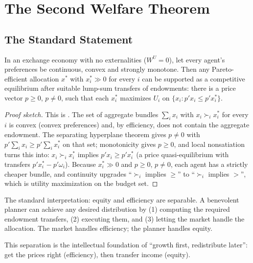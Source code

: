 \documentclass[../structural_economics_book.tex]{subfiles}
\begin{document}
\section{The Second Welfare Theorem}
\label{ch02:sec:SWT}

\subsection{The Standard Statement}

\begin{theorem}\label{ch02:thm:SWT}
In an exchange economy with no externalities ($W^U = 0$), let every agent's preferences be continuous, convex and strongly monotone. Then any Pareto-efficient allocation $x^*$ with $x_i^* \gg 0$ for every $i$ can be supported as a competitive equilibrium after suitable lump-sum transfers of endowments: there is a price vector $p \ge 0$, $p \neq 0$, such that each $x_i^*$ maximizes $U_i$ on $\{x_i : p'x_i \le p'x_i^*\}$.
\end{theorem}

\begin{proof}[Proof sketch]
This is \citet[Props.~16.D.1 and 16.D.2]{mascolell1995microeconomic}. The set of aggregate bundles $\sum_i x_i$ with $x_i \succ_i x_i^*$ for every $i$ is convex (convex preferences) and, by efficiency, does not contain the aggregate endowment. The separating hyperplane theorem gives $p \neq 0$ with $p'\sum_i x_i \ge p'\sum_i x^*_i$ on that set; monotonicity gives $p \ge 0$, and local nonsatiation turns this into: $x_i \succ_i x_i^*$ implies $p'x_i \ge p'x_i^*$ (a price quasi-equilibrium with transfers $p'x_i^* - p'\omega_i$). Because $x_i^* \gg 0$ and $p \ge 0$, $p \neq 0$, each agent has a strictly cheaper bundle, and continuity upgrades ``$\succ_i$ implies $\ge$'' to ``$\succ_i$ implies $>$'', which is utility maximization on the budget set.
\end{proof}

The standard interpretation: equity and efficiency are separable. A benevolent planner can achieve any desired distribution by (1) computing the required endowment transfers, (2) executing them, and (3) letting the market handle the allocation. The market handles efficiency; the planner handles equity.

This separation is the intellectual foundation of ``growth first, redistribute later'': get the prices right (efficiency), then transfer income (equity).
\end{document}
